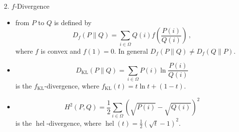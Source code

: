 \documentclass[final]{beamer}
\DeclareMathOperator{\hel}{hel}
\newcommand{\kl}[2]{D_{\mathrm{KL}}( #1 \parallel #2 )}
\newlength{\onecolwid}
\begin{document}
\begin{frame}[t]
\begin{columns}[t]
\begin{column}{\onecolwid}
		
	\begin{block}{2. $ f $-Divergence}
\begin{itemize}	
		\item	{}  from $ P $ 
		to $ Q $
			is defined by
			\begin{equation}\label{eq:definition_f_divergence}
			D_f(P\parallel Q) = \sum_{i\in \Omega} Q(i) f\left( 
			\frac{P(i)}{Q(i)} 
			\right) \,,
			\end{equation}
			where $ f $ is convex and $ f(1)=0 $.
In general
			$ D_f(P\parallel 
			Q)\ne 
			D_f(Q\parallel P) $.
			
			\item {} \[ \kl{P}{Q}= \sum_{i\in 
			\Omega} P(i) \ln\frac{P(i)}{Q(i)}  \] is the $ 
			f_{\mathrm{KL}} 
			$-divergence,
			where
			 $ f_{\mathrm{KL}}(t) = t\ln t + (1-t) $.
			
		\item	{}
	 \[ H^2(P,Q) = 
		\frac{1}{2} \sum_{i\in \Omega} 
		(\sqrt{P(i)}-\sqrt{Q(i)})^2 \] is 
		the $ \hel 
		$-divergence, where
			 $ \hel(t)=\frac{1}{2}(\sqrt{t}-1)^2 $.

			

\end{itemize}
\end{block}
\end{column}
\end{columns}
\end{frame}
\end{document}
